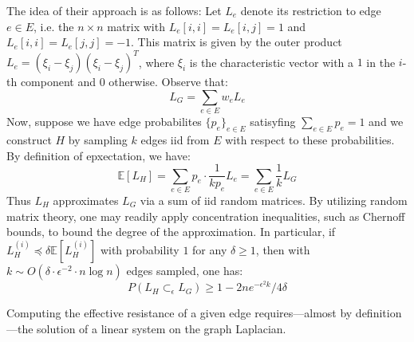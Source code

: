 \documentclass[10pt]{article}
\begin{document}
The idea of their approach is as follows: Let $L_e$ denote its restriction to edge $e \in E$, i.e. the $n \times n$ matrix with $L_e[i,i] = L_e[i,j]  = 1$ and $L_e[i,i] = L_e[j,j]  = -1$. This matrix is given by the outer product $L_e = (\xi_i - \xi_j)(\xi_i - \xi_j)^T$, where $\xi_{i}$ is the characteristic vector with a $1$ in the $i$-th component and $0$ otherwise. Observe that: 
$$ L_G = \sum\limits_{e \in E} w_e L_e$$
Now, suppose we have edge probabilites $\{p_e\}_{e \in E}$ satisyfing $\sum_{e \in E} p_e = 1$ and we construct $H$ by sampling $k$ edges iid from $E$ with respect to these probabilities. By definition of epxectation, we have:
$$ \mathbb{E}[L_H] = \sum\limits_{e \in E} p_e \cdot \frac{1}{k p_e} L_e = \sum\limits_{e \in E} \frac{1}{k} L_G$$
Thus $L_H$ approximates $L_G$ via a sum of iid random matrices. By utilizing random matrix theory, one may readily apply concentration inequalities, such as Chernoff bounds, to bound the degree of the approximation. In particular, if $L_H^{(i)} \preceq \delta \mathbb{E}[L_H^{(i)}]$ with probability $1$ for any $\delta \geq 1$, then with $k \sim O(\delta \cdot \epsilon^{-2} \cdot n \log n)$ edges sampled, one has: 
$$ P(L_H \subset_{\epsilon} L_G) \geq 1 - 2ne^{-\epsilon^{2} k} / 4\delta$$ 

Computing the effective resistance of a given edge requires---almost by definition---the solution of a linear system on the graph Laplacian.
\end{document}
